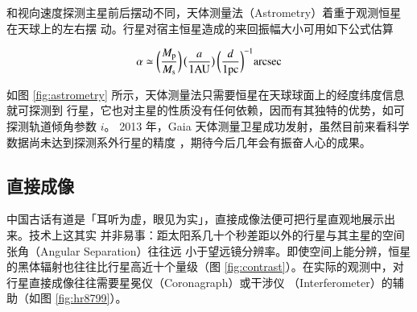 和视向速度探测主星前后摆动不同，天体测量法（Astrometry）着重于观测恒星在天球上的左右摆
动。行星对宿主恒星造成的来回振幅大小可用如下公式估算

\begin{equation}  \label{eq:astrometry} 
\alpha \simeq \bigg(\frac{M_\mathrm{p}}{M_\mathrm{s}}\bigg) \, \big(\frac{a}{1 \mathrm{AU}}\big) \, \bigg(\frac{d}{1 \mathrm{pc}}\bigg)^{-1} \mathrm{arcsec}
\end{equation} %

如图 \ref{fig:astrometry} 所示，天体测量法只需要恒星在天球球面上的经度纬度信息就可探测到
行星，它也对主星的性质没有任何依赖，因而有其独特的优势，如可探测轨道倾角参数 $i$。
2013 年，Gaia 天体测量卫星成功发射，虽然目前来看科学数据尚未达到探测系外行星的精度
\cite{GaiaCo2016}，期待今后几年会有振奋人心的成果。


\subsection{直接成像}  \label{sec:drctimgmeth}
中国古话有道是「耳听为虚，眼见为实」，直接成像法便可把行星直观地展示出来。技术上这其实
并非易事：距太阳系几十个秒差距以外的行星与其主星的空间张角（Angular Separation）往往远
小于望远镜分辨率。即使空间上能分辨，恒星的黑体辐射也往往比行星高近十个量级（图 
\ref{fig:contrast}）。在实际的观测中，对行星直接成像往往需要星冕仪（Coronagraph）或干涉仪
（Interferometer）的辅助（如图 \ref{fig:hr8799}）。

